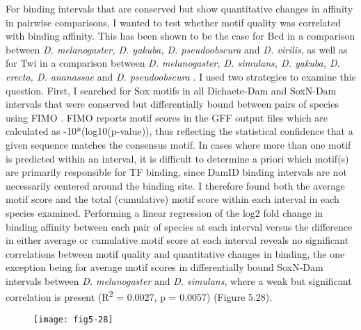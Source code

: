 For binding intervals that are conserved but show quantitative changes in affinity in pairwise comparisons, I wanted to test whether motif quality was correlated with binding affinity. This has been shown to be the case for Bcd in a comparison between \emph{D. melanogaster, D. yakuba, D. pseudoobscura} and \emph{D. virilis}, as well as for Twi in a comparison between \emph{D. melanogaster, D. simulans, D. yakuba, D. erecta, D. ananassae} and \emph{D. pseudoobscura} \citep{he_high_2011,paris_extensive_2013}. I used two strategies to examine this question. First, I searched for Sox motifs in all Dichaete-Dam and SoxN-Dam intervals that were conserved but differentially bound between pairs of species using FIMO \citep{grant_fimo:_2011}. FIMO reports motif scores in the GFF output files which are calculated as -10*(log10(p-value)), thus reflecting the statistical confidence that a given sequence matches the consensus motif. In cases where more than one motif is predicted within an interval, it is difficult to determine a priori which motif(s) are primarily responsible for TF binding, since DamID binding intervals are not necessarily centered around the binding site. I therefore found both the average motif score and the total (cumulative) motif score within each interval in each species examined. Performing a linear regression of the log2 fold change in binding affinity between each pair of species at each interval versus the difference in either average or cumulative motif score at each interval reveals no significant correlations between motif quality and quantitative changes in binding, the one exception being for average motif scores in differentially bound SoxN-Dam intervals between \emph{D. melanogaster} and \emph{D. simulans}, where a weak but significant correlation is present (R\textsuperscript{2} = 0.0027, p = 0.0057) (Figure 5.28).\\

\begin{figure}[H]
\centering
\texttt{[image: fig5-28]}
\label{Figure 5.28}
\end{figure}

